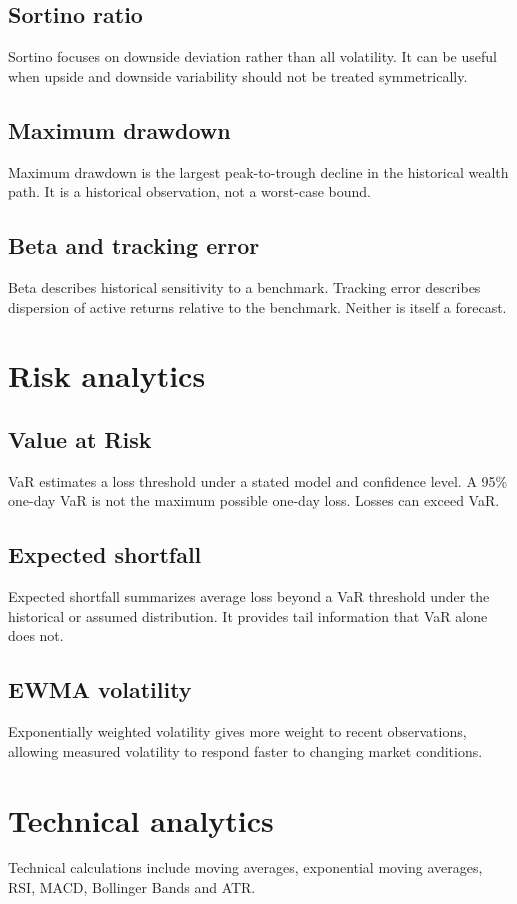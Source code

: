 \documentclass[11pt]{article}
\begin{document}
\subsection{Sortino ratio}
Sortino focuses on downside deviation rather than all volatility. It can be useful when upside and downside variability should not be treated symmetrically.

\subsection{Maximum drawdown}
Maximum drawdown is the largest peak-to-trough decline in the historical wealth path. It is a historical observation, not a worst-case bound.

\subsection{Beta and tracking error}
Beta describes historical sensitivity to a benchmark. Tracking error describes dispersion of active returns relative to the benchmark. Neither is itself a forecast.

\section{Risk analytics}
\subsection{Value at Risk}
VaR estimates a loss threshold under a stated model and confidence level. A 95\% one-day VaR is not the maximum possible one-day loss. Losses can exceed VaR.

\subsection{Expected shortfall}
Expected shortfall summarizes average loss beyond a VaR threshold under the historical or assumed distribution. It provides tail information that VaR alone does not.

\subsection{EWMA volatility}
Exponentially weighted volatility gives more weight to recent observations, allowing measured volatility to respond faster to changing market conditions.

\section{Technical analytics}
Technical calculations include moving averages, exponential moving averages, RSI, MACD, Bollinger Bands and ATR.
\end{document}

